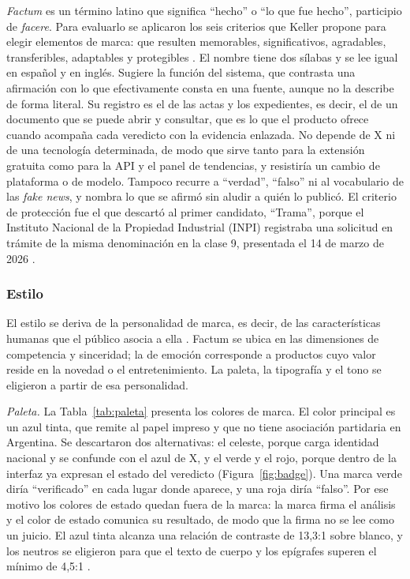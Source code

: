 \textit{Factum} es un término latino que significa \enquote{hecho} o \enquote{lo que fue hecho}, participio de \textit{facere}. Para evaluarlo se aplicaron los seis criterios que Keller propone para elegir elementos de marca: que resulten memorables, significativos, agradables, transferibles, adaptables y protegibles \parencite{Keller2013}. El nombre tiene dos sílabas y se lee igual en español y en inglés. Sugiere la función del sistema, que contrasta una afirmación con lo que efectivamente consta en una fuente, aunque no la describe de forma literal. Su registro es el de las actas y los expedientes, es decir, el de un documento que se puede abrir y consultar, que es lo que el producto ofrece cuando acompaña cada veredicto con la evidencia enlazada. No depende de X ni de una tecnología determinada, de modo que sirve tanto para la extensión gratuita como para la API y el panel de tendencias, y resistiría un cambio de plataforma o de modelo. Tampoco recurre a \enquote{verdad}, \enquote{falso} ni al vocabulario de las \textit{fake news}, y nombra lo que se afirmó sin aludir a quién lo publicó. El criterio de protección fue el que descartó al primer candidato, \enquote{Trama}, porque el Instituto Nacional de la Propiedad Industrial (INPI) registraba una solicitud en trámite de la misma denominación en la clase 9, presentada el 14 de marzo de 2026 \parencite{INPIMarcas2026}.

\subsubsection{Estilo}

El estilo se deriva de la personalidad de marca, es decir, de las características humanas que el público asocia a ella \parencite{Aaker1997}. Factum se ubica en las dimensiones de competencia y sinceridad; la de emoción corresponde a productos cuyo valor reside en la novedad o el entretenimiento. La paleta, la tipografía y el tono se eligieron a partir de esa personalidad.

\textit{Paleta.} La Tabla~\ref{tab:paleta} presenta los colores de marca. El color principal es un azul tinta, que remite al papel impreso y que no tiene asociación partidaria en Argentina. Se descartaron dos alternativas: el celeste, porque carga identidad nacional y se confunde con el azul de X, y el verde y el rojo, porque dentro de la interfaz ya expresan el estado del veredicto (Figura~\ref{fig:badge}). Una marca verde diría \enquote{verificado} en cada lugar donde aparece, y una roja diría \enquote{falso}. Por ese motivo los colores de estado quedan fuera de la marca: la marca firma el análisis y el color de estado comunica su resultado, de modo que la firma no se lee como un juicio. El azul tinta alcanza una relación de contraste de 13,3:1 sobre blanco, y los neutros se eligieron para que el texto de cuerpo y los epígrafes superen el mínimo de 4,5:1 \parencite{W3C2023}.

